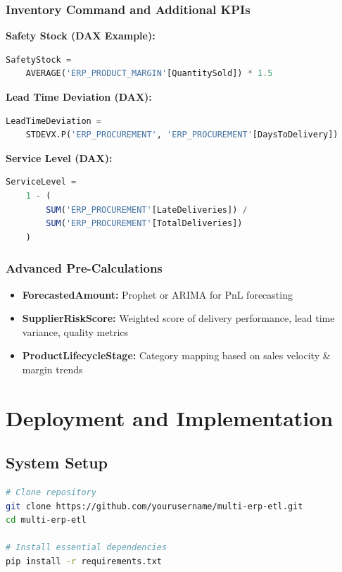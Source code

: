 \documentclass[a4paper,10pt]{article}
\begin{document}
\subsection{Inventory Command and Additional KPIs}
\textbf{Safety Stock (DAX Example):}
\begin{lstlisting}[language=SQL]
SafetyStock =
    AVERAGE('ERP_PRODUCT_MARGIN'[QuantitySold]) * 1.5
\end{lstlisting}

\textbf{Lead Time Deviation (DAX):}
\begin{lstlisting}[language=SQL]
LeadTimeDeviation =
    STDEVX.P('ERP_PROCUREMENT', 'ERP_PROCUREMENT'[DaysToDelivery])
\end{lstlisting}

\textbf{Service Level (DAX):}
\begin{lstlisting}[language=SQL]
ServiceLevel =
    1 - (
        SUM('ERP_PROCUREMENT'[LateDeliveries]) /
        SUM('ERP_PROCUREMENT'[TotalDeliveries])
    )
\end{lstlisting}

\subsection{Advanced Pre-Calculations}
\begin{itemize}[leftmargin=2em]
    \item \textbf{ForecastedAmount:} Prophet or ARIMA for PnL forecasting
    \item \textbf{SupplierRiskScore:} Weighted score of delivery performance, lead time variance, quality metrics
    \item \textbf{ProductLifecycleStage:} Category mapping based on sales velocity \& margin trends
\end{itemize}

\chapter{Deployment and Implementation}

\section{System Setup}
\begin{lstlisting}[language=bash]
# Clone repository
git clone https://github.com/yourusername/multi-erp-etl.git
cd multi-erp-etl

# Install essential dependencies
pip install -r requirements.txt
\end{lstlisting}
\end{document}

